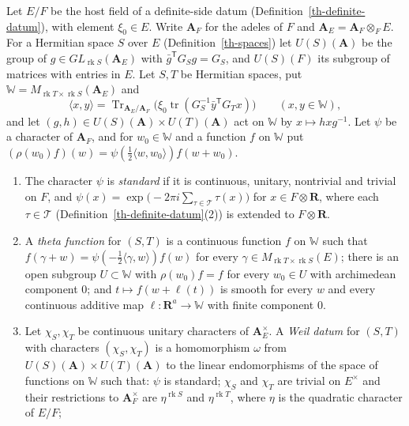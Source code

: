 \begin{definition}\label{th-weil-datum}
Let $E/F$ be the host field of a definite-side datum
(Definition~\ref{th-definite-datum}), with element $\xi_0\in E$. Write
$\mathbf A_F$ for the adeles of $F$ and $\mathbf A_E=\mathbf A_F\otimes_FE$.
For a Hermitian space $S$ over $E$ (Definition~\ref{th-spaces}) let
$U(S)(\mathbf A)$ be the group of $g\in GL_{\operatorname{rk}S}(\mathbf A_E)$
with $\bar g^{\mathsf T}G_Sg=G_S$, and $U(S)(F)$ its subgroup of matrices
with entries in $E$. Let $S,T$ be Hermitian spaces, put
$\mathbb W=M_{\operatorname{rk}T\times\operatorname{rk}S}(\mathbf A_E)$ and
\[
\langle x,y\rangle=\operatorname{Tr}_{\mathbf A_E/\mathbf A_F}\bigl(\xi_0\operatorname{tr}(G_S^{-1}\bar y^{\mathsf T}G_Tx)\bigr)\qquad(x,y\in\mathbb W),
\]
and let $(g,h)\in U(S)(\mathbf A)\times U(T)(\mathbf A)$ act on $\mathbb W$ by
$x\mapsto hxg^{-1}$. Let $\psi$ be a character of $\mathbf A_F$, and for
$w_0\in\mathbb W$ and a function $f$ on $\mathbb W$ put
$(\rho(w_0)f)(w)=\psi(\tfrac12\langle w,w_0\rangle)f(w+w_0)$.
\begin{enumerate}
\item The character $\psi$ is \emph{standard} if it is continuous, unitary,
  nontrivial and trivial on $F$, and
  $\psi(x)=\exp\bigl(-2\pi i\sum_{\tau\in\mathcal T}\tau(x)\bigr)$ for
  $x\in F\otimes\mathbf R$, where each $\tau\in\mathcal T$
  (Definition~\ref{th-definite-datum}(2)) is extended to $F\otimes\mathbf R$.
\item A \emph{theta function} for $(S,T)$ is a continuous function $f$ on
  $\mathbb W$ such that
  $f(\gamma+w)=\psi(-\tfrac12\langle\gamma,w\rangle)f(w)$ for every
  $\gamma\in M_{\operatorname{rk}T\times\operatorname{rk}S}(E)$; there is an
  open subgroup $U\subset\mathbb W$ with $\rho(w_0)f=f$ for every $w_0\in U$
  with archimedean component $0$; and $t\mapsto f(w+\ell(t))$ is smooth for
  every $w$ and every continuous additive map $\ell\colon\mathbf R^a\to\mathbb W$
  with finite component $0$.
\item Let $\chi_S,\chi_T$ be continuous unitary characters of
  $\mathbf A_E^\times$. A \emph{Weil datum} for $(S,T)$ with characters
  $(\chi_S,\chi_T)$ is a homomorphism $\omega$ from
  $U(S)(\mathbf A)\times U(T)(\mathbf A)$ to the linear endomorphisms of the
  space of functions on $\mathbb W$ such that: $\psi$ is standard; $\chi_S$ and
  $\chi_T$ are trivial on $E^\times$ and their restrictions to
  $\mathbf A_F^\times$ are $\eta^{\operatorname{rk}S}$ and
  $\eta^{\operatorname{rk}T}$, where $\eta$ is the quadratic character of $E/F$;

\end{enumerate}
\end{definition}
